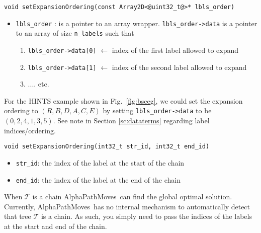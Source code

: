 \documentclass[12pt,letterpaper]{article}
\def\APM{{\ttfamily AlphaPathMoves}~}
\def\Tree{\mathcal{T}}
\def\Tree{\mathcal{T}}
\begin{document}
\begin{lstlisting}
void setExpansionOrdering(const Array2D<@uint32_t@>* lbls_order)
\end{lstlisting}
\begin{itemize}
\item \lstinline{lbls_order} : is a pointer to an array wrapper. \lstinline{lbls_order->data} is a pointer to an array of size \lstinline[mathescape=true]{n_labels} such that
    \begin{enumerate}
\item[] \lstinline{lbls_order->data[0]} $\gets$ index of the first label allowed to expand
\item[] \lstinline{lbls_order->data[1]} $\gets$ index of the second label allowed to expand
\item[] .... etc.
\end{enumerate}
\end{itemize}
For the HINTS example shown in Fig.~\ref{fig:bsceg}, we could set the expansion ordering to $(R,B,D,A,C,E)$ by setting  \lstinline{lbls_order->data} to be $(0,2,4,1,3,5)$. See note in Section \ref{sc:dataterms} regarding label indices/ordering.
\\
\begin{lstlisting}
void setExpansionOrdering(int32_t str_id, int32_t end_id)
\end{lstlisting}
\begin{itemize}
\item \lstinline{str_id}: the index of the label at the start of the chain
\item \lstinline{end_id}: the index of the label at the end of the chain
\end{itemize}
\begin{tcolorbox}
When $\Tree$ is a chain \APM can find the global optimal solution. Currently, \APM has no internal mechanism to automatically detect that tree $\Tree$ is a chain. As such, you simply need to pass the indices of the labels at the start and end of the chain.
\end{tcolorbox}
\end{document}

